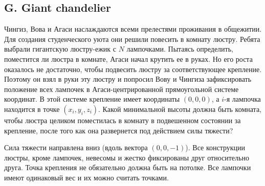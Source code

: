 







\subsection*{G. Giant chandelier}
 

Чингиз, Вова и Агаси наслаждаются всеми прелестями проживания в общежитии. Для создания студенческого уюта они решили повесить в комнату люстру. Ребята выбрали гигантскую люстру-ежик с $N$ лампочками. Пытаясь определить, поместится ли люстра в комнате, Агаси начал крутить ее в руках. Но его роста оказалось не достаточно, чтобы подвесить люстру за соответствующее крепление. Поэтому он взял в руки эту люстру и попросил Вову и Чингиза зафиксировать положение всех лампочек в Агаси-центрированной прямоугольной системе координат. В этой системе крепление имеет координаты $(0, 0, 0)$, а $i$-я лампочка находится в точке $(x_i, y_i, z_i)$. Какой минимальной высоты должна быть комната, чтобы люстра целиком поместилась в комнату в подвешенном состоянии за крепление, после того как она развернется под действием силы тяжести?

Сила тяжести направлена вниз (вдоль вектора $(0, 0, -1)$). Все конструкции люстры, кроме лампочек, невесомы и жестко фиксированы друг относительно друга. Точка крепления не обязательно должна быть на потолке. Все лампочки имеют одинаковый вес и их можно считать точками. 


